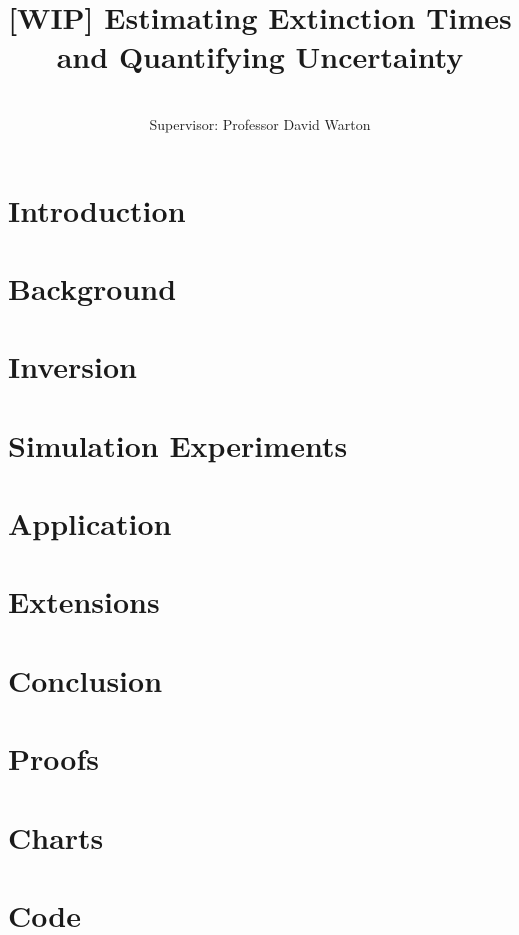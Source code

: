 \documentclass[honours,12pt]{UNSWthesis}
\title{[WIP] Estimating Extinction Times and Quantifying Uncertainty}
\author{\Authornameonly\\{\bigskip}Supervisor: Professor David Warton}
\begin{document}
%
%

\beforepreface

\afterpage{\blankpage}







\afterpreface

\afterpage{\blankpage}

%
%

\chapter{Introduction}\label{chap: intro}


\chapter{Background}\label{chap: background}


\chapter{Inversion}\label{chap: inversion}


\chapter{Simulation Experiments}\label{chap: experiments}


\chapter{Application}\label{chap: application}


\chapter{Extensions}\label{chap: extensions}


\chapter{Conclusion}\label{chap: conclusion}


\appendix

\chapter{Proofs}
\label{apx: A}

\chapter{Charts}

\chapter{Code}


\end{document}
